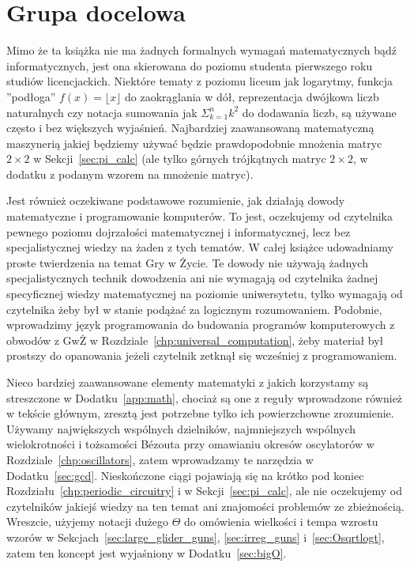\section*{Grupa docelowa}

Mimo że ta książka nie ma żadnych formalnych wymagań matematycznych bądź informatycznych, jest ona skierowana do poziomu studenta pierwszego roku studiów licencjackich. Niektóre tematy z poziomu liceum jak logarytmy, funkcja ''podłoga'' $f(x) = \lfloor x \rfloor$ do zaokrąglania w dół, reprezentacja dwójkowa liczb naturalnych czy notacja sumowania jak $\Sigma_{k=1}^n k^2$ do dodawania liczb, są używane często i bez większych wyjaśnień. Najbardziej zaawansowaną matematyczną maszynerią jakiej będziemy używać będzie prawdopodobnie mnożenia matryc $2 \times 2$ w Sekcji~\ref{sec:pi_calc} (ale tylko górnych trójkątnych matryc $2 \times 2$, w dodatku z podanym wzorem na mnożenie matryc).

Jest również oczekiwane podstawowe rozumienie, jak działają dowody matematyczne i programowanie komputerów. To jest, oczekujemy od czytelnika pewnego poziomu dojrzałości matematycznej i informatycznej, lecz bez specjalistycznej wiedzy na żaden z tych tematów. W całej książce udowadniamy proste twierdzenia na temat Gry w Życie. Te dowody nie używają żadnych specjalistycznych technik dowodzenia ani nie wymagają od czytelnika żadnej specyficznej wiedzy matematycznej na poziomie uniwersytetu, tylko wymagają od czytelnika żeby był w stanie podążać za logicznym rozumowaniem. Podobnie, wprowadzimy język programowania do budowania programów komputerowych z obwodów z GwŻ w Rozdziale~\ref{chp:universal_computation}, żeby materiał był prostszy do opanowania jeżeli czytelnik zetknął się wcześniej z programowaniem.

Nieco bardziej zaawansowane elementy matematyki z jakich korzystamy są streszczone w Dodatku~\ref{app:math}, chociaż są one z reguły wprowadzone również w tekście głównym, zresztą jest potrzebne tylko ich powierzchowne zrozumienie. Używamy największych wspólnych dzielników, najmniejszych wspólnych wielokrotności i tożsamości B\'ezouta przy omawianiu okresów oscylatorów w Rozdziale~\ref{chp:oscillators}, zatem wprowadzamy te narzędzia w Dodatku~\ref{sec:gcd}. Nieskończone ciągi pojawiają się na krótko pod koniec Rozdziału~\ref{chp:periodic_circuitry} i w Sekcji~\ref{sec:pi_calc}, ale nie oczekujemy od czytelników jakiejś wiedzy na ten temat ani znajomości problemów ze zbieżnością. Wreszcie, użyjemy notacji dużego $\Theta$ do omówienia wielkości i tempa wzrostu wzorów w Sekcjach~\ref{sec:large_glider_guns}, \ref{sec:irreg_guns} i~\ref{sec:Osqrtlogt}, zatem ten koncept jest wyjaśniony w Dodatku~\ref{sec:bigO}.


